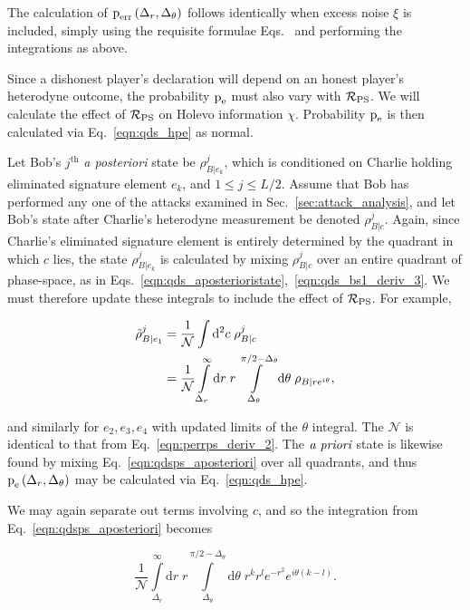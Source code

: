 The calculation of $\text{p}_{\text{err}}\left(\Delta_r, \Delta_\theta\right)$ follows identically when excess noise $\xi$ is included, simply using the requisite formulae Eqs.~ and performing the integrations as above. 


Since a dishonest player's declaration will depend on an honest player's heterodyne outcome, the probability $\text{p}_{\text{e}}$ must also vary with $\mathcal{R}_{\text{PS}}$. We will calculate the effect of $\mathcal{R}_{\text{PS}}$ on Holevo information $\chi$. Probability $\text{p}_{\text{e}}$ is then calculated via Eq.~\ref{eqn:qds_hpe} as normal.

Let Bob's $j^{\text{th}}$ \emph{a posteriori} state be $\rho_{B | e_k}^j$, which is conditioned on Charlie holding eliminated signature element $e_k$, and $1\le j \le L/2$. Assume that Bob has performed any one of the attacks examined in Sec.~\ref{sec:attack_analysis}, and let Bob's state after Charlie's heterodyne measurement be denoted $\rho_{B | c}^j$. Again, since Charlie's eliminated signature element is entirely determined by the quadrant in which $c$ lies, the state $\rho_{B | e_k}^j$ is calculated by mixing $\rho_{B | c}^j$ over an entire quadrant of phase-space, as in Eqs.~\ref{eqn:qds_aposterioristate},~\ref{eqn:qds_bs1_deriv_3}. We must therefore update these integrals to include the effect of $\mathcal{R}_{\text{PS}}$. For example,

\begin{align}\label{eqn:qdsps_aposteriori}
\tilde{\rho}_{B | e_1}^j &= \frac{1}{\mathcal{N}} \int \Diff2 c \; \rho_{B | c}^j \notag \\
%
&=\frac{1}{\mathcal{N}} \int\limits_{\Delta_r}^\infty \mathrm{d}r\; r\int\limits_{\Delta_\theta}^{\pi/2 - \Delta_\theta} \mathrm{d}\theta \; \rho_{B | r e^{i \theta}},
\end{align}

\noindent and similarly for $e_2, e_3, e_4$ with updated limits of the $\theta$ integral. The $\mathcal{N}$ is identical to that from Eq.~\ref{eqn:perrps_deriv_2}. The $\emph{a priori}$ state is likewise found by mixing Eq.~\ref{eqn:qdsps_aposteriori} over all quadrants, and thus $\text{p}_{\text{e}}\left(\Delta_r, \Delta_\theta\right)$ may be calculated via Eq.~\ref{eqn:qds_hpe}. 

We may again separate out terms involving $c$, and so the integration from Eq.~\ref{eqn:qdsps_aposteriori} becomes

\begin{equation}
\frac{1}{\mathcal{N}} \int\limits_{\Delta_r}^{\infty} \mathrm{d}r \; r \int\limits_{\Delta_\theta}^{\pi/2 - \Delta_\theta} \mathrm{d}\theta \; r^k r^l e^{-r^2} e^{i \theta \left(k - l\right)}.
\end{equation}

